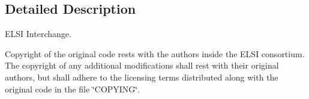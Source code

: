 \subsection{Detailed Description}
E\+L\+S\+I Interchange. 

Copyright of the original code rests with the authors inside the E\+L\+S\+I consortium. The copyright of any additional modifications shall rest with their original authors, but shall adhere to the licensing terms distributed along with the original code in the file \char`\"{}\+C\+O\+P\+Y\+I\+N\+G\char`\"{}. 